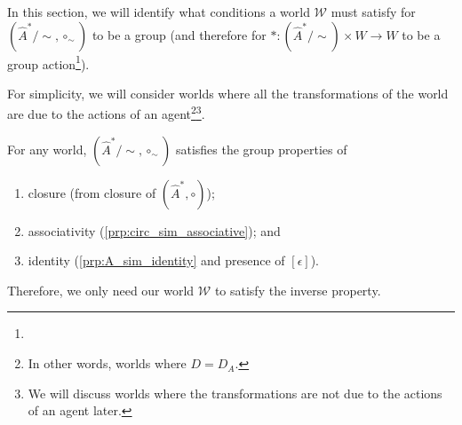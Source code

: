 In this section, we will identify what conditions a world $\mathscr{W}$ must satisfy for $(\hat{A}^{*}/\sim, \circ_{\sim})$ to be a group (and therefore for $\ast: (\hat{A}^{*}/\sim) \times W \to W$ to be a group action\footnote{
}).

For simplicity, we will consider worlds where all the transformations of the world are due to the actions of an agent\footnote{In other words, worlds where $D = D_{A}$.}\footnote{We will discuss worlds where the transformations are not due to the actions of an agent later.}.

For any world, $(\hat{A}^{*}/\sim, \circ_{\sim})$ satisfies the group properties of
\begin{enumerate}[(1)]
    \item closure (from closure of $(\hat{A}^{*}, \circ)$);
    \item associativity (\cref{prp:circ_sim_associative}); and
    \item identity (\cref{prp:A_sim_identity} and presence of $[\epsilon]$).
\end{enumerate}

Therefore, we only need our world $\mathscr{W}$ to satisfy the inverse property.

